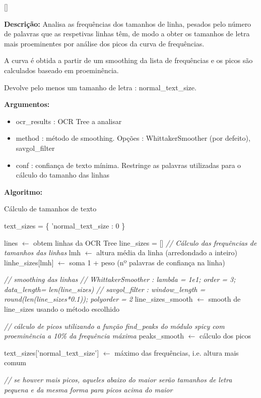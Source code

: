 [\normalsize]

\textbf{Descrição:} Analisa as frequências dos tamanhos de linha, pesados pelo número de palavras que as respetivas linhas têm, de modo a obter os tamanhos de letra mais proeminentes por análise dos picos da curva de frequências.

A curva é obtida a partir de um smoothing da lista de frequências e os picos são calculados baseado em proeminência.

Devolve pelo menos um tamanho de letra : normal\_text\_size.

\textbf{Argumentos:}
\begin{itemize}\setlength\itemsep{-0.3em}
	\item ocr\_results : OCR Tree a analisar
	\item method : método de smoothing. Opções : WhittakerSmoother (por defeito), savgol\_filter
	\item conf : confiança de texto mínima. Restringe as palavras utilizadas para o cálculo do tamanho das linhas
\end{itemize}

\textbf{Algoritmo:}
\begin{breakablealgorithm}
	\caption{Cálculo de tamanhos de texto}
	\begin{algorithmic}[1]
		
		\State text\_sizes = \{
			'normal\_text\_size : 0
		\}
		
		\State lines $\leftarrow$ obtem linhas da OCR Tree
		\State line\_sizes = []
		\State \textit{// Cálculo das frequências de tamanhos das linhas}
				\State lmh $\leftarrow$ altura média da linha (arredondado a inteiro)
				\State linhe\_sizes[lmh] $\leftarrow$ soma 1 + peso (nº palavras de confiança na linha)
			\EndIf
		\EndFor
		
		\State \textit{// smoothing das linhas}
		\State \textit{// WhittakerSmoother : lambda = 1e1; order = 3; data\_length= len(line\_sizes)}
		\State \textit{// savgol\_filter : window\_length = round(len(line\_sizes*0.1)); polyorder = 2}
		\State line\_sizes\_smooth $\leftarrow$ smooth de line\_sizes usando o método escolhido
		
		\State \textit{// cálculo de picos utilizando a função find\_peaks do módulo spicy com proeminência a 10\% da frequência máxima}
		\State peaks\_smooth $\leftarrow$ cálculo dos picos
		
		\State text\_sizes['normal\_text\_size'] $\leftarrow$ máximo das frequências, i.e. altura mais comum
		
		\State \textit{// se houver mais picos, aqueles abaixo do maior serão tamanhos de letra pequena e da mesma forma para picos acima do maior}
		
	\end{algorithmic}
\end{breakablealgorithm}



